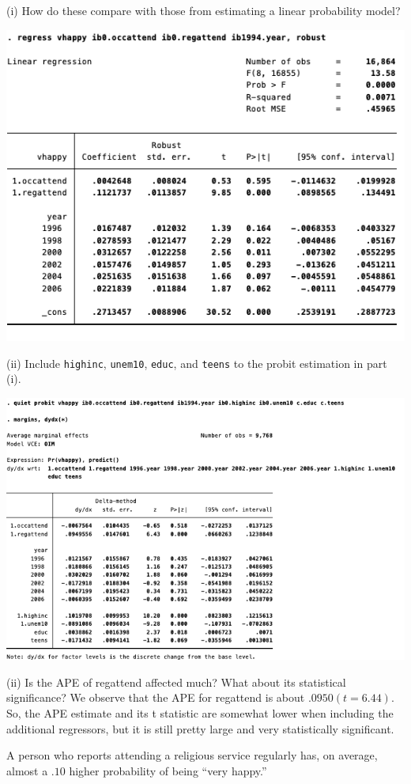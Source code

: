 \documentclass[
  10pt,
  ignorenonframetext,
]{beamer}
\begin{document}
\begin{frame}{(i) How do these compare with those from estimating a
\quad linear probability model?}
\protect\hypertarget{i-how-do-these-compare-with-those-from-estimating-a-linear-probability-model}{}
\begin{center}\includegraphics[width=0.8\linewidth]{pictures/ex2-LPM} \end{center}
\end{frame}

\begin{frame}{(ii) Include \texttt{highinc}, \texttt{unem10},
\texttt{educ}, and \texttt{teens} to the \quad probit estimation in part
(i).}
\protect\hypertarget{ii-include-highinc-unem10-educ-and-teens-to-the-probit-estimation-in-part-i.}{}
\begin{center}\includegraphics[width=0.9\linewidth]{pictures/ex2-PROBIT-APE-add4ctrls} \end{center}
\end{frame}

\begin{frame}{(ii) Is the APE of regattend affected much? What about its
statistical significance?}
\protect\hypertarget{ii-is-the-ape-of-regattend-affected-much-what-about-its-statistical-significance}{}
We observe that the APE for regattend is about \(.0950 (t = 6.44)\). So,
the APE estimate and its t statistic are somewhat lower when including
the additional regressors, but it is still pretty large and very
statistically significant.

A person who reports attending a religious service regularly has, on
average, almost a \(.10\) higher probability of being ``very happy.''
\end{frame}
\end{document}
